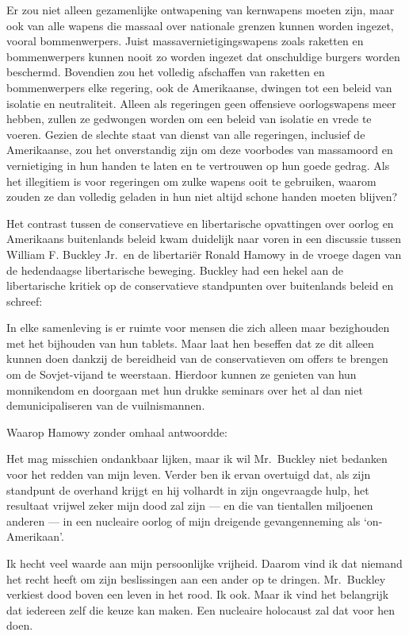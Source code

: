 \documentclass[
  a5paper,
  smalldemyvopaper,10pt,twoside,onecolumn,openright,extrafontsizes,hidelinks]{memoir}
\renewenvironment{quote}%
               {\list{}{\rightmargin=.6cm\leftmargin=.6cm}%
                \itshape \item[]}%
               {\endlist}
\begin{document}
Er zou niet alleen gezamenlijke ontwapening van kernwapens moeten zijn,
maar ook van alle wapens die massaal over nationale grenzen kunnen
worden ingezet, vooral bommenwerpers. Juist massavernietigingswapens
zoals raketten en bommenwerpers kunnen nooit zo worden ingezet dat
onschuldige burgers worden beschermd. Bovendien zou het volledig
afschaffen van raketten en bommenwerpers elke regering, ook de
Amerikaanse, dwingen tot een beleid van isolatie en neutraliteit. Alleen
als regeringen geen offensieve oorlogswapens meer hebben, zullen ze
gedwongen worden om een beleid van isolatie en vrede te voeren. Gezien
de slechte staat van dienst van alle regeringen, inclusief de
Amerikaanse, zou het onverstandig zijn om deze voorbodes van massamoord
en vernietiging in hun handen te laten en te vertrouwen op hun goede
gedrag. Als het illegitiem is voor regeringen om zulke wapens ooit te
gebruiken, waarom zouden ze dan volledig geladen in hun niet altijd
schone handen moeten blijven?

Het contrast tussen de conservatieve en libertarische opvattingen over
oorlog en Amerikaans buitenlands beleid kwam duidelijk naar voren in een
discussie tussen William F. Buckley Jr.~en de libertariër Ronald Hamowy
in de vroege dagen van de hedendaagse libertarische beweging. Buckley
had een hekel aan de libertarische kritiek op de conservatieve
standpunten over buitenlands beleid en schreef:

\begin{quote}
In elke samenleving is er ruimte voor mensen die zich alleen maar
bezighouden met het bijhouden van hun tablets. Maar laat hen beseffen
dat ze dit alleen kunnen doen dankzij de bereidheid van de
conservatieven om offers te brengen om de Sovjet-vijand te weerstaan.
Hierdoor kunnen ze genieten van hun monnikendom en doorgaan met hun
drukke seminars over het al dan niet demunicipaliseren van de
vuilnismannen.

Waarop Hamowy zonder omhaal antwoordde:

Het mag misschien ondankbaar lijken, maar ik wil Mr.~Buckley niet
bedanken voor het redden van mijn leven. Verder ben ik ervan overtuigd
dat, als zijn standpunt de overhand krijgt en hij volhardt in zijn
ongevraagde hulp, het resultaat vrijwel zeker mijn dood zal zijn --- en
die van tientallen miljoenen anderen --- in een nucleaire oorlog of mijn
dreigende gevangenneming als `on-Amerikaan'.

Ik hecht veel waarde aan mijn persoonlijke vrijheid. Daarom vind ik dat
niemand het recht heeft om zijn beslissingen aan een ander op te
dringen. Mr.~Buckley verkiest dood boven een leven in het rood. Ik ook.
Maar ik vind het belangrijk dat iedereen zelf die keuze kan maken. Een
nucleaire holocaust zal dat voor hen doen.
\end{quote}
\end{document}
